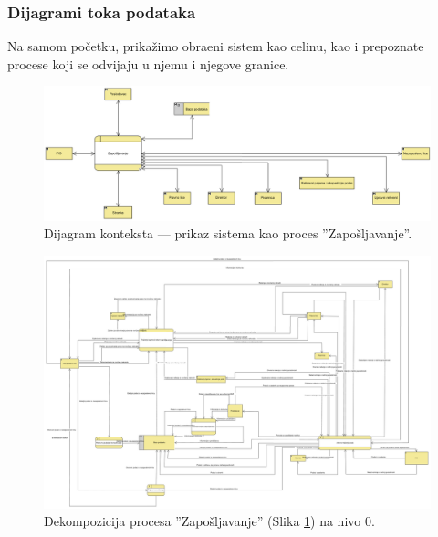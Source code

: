 \begin{mylandscape}
	\subsubsection{Dijagrami toka podataka}
	
	Na samom po\v cetku, prika\v zimo obra\dj eni sistem kao celinu, kao i prepoznate procese koji se odvijaju u njemu i njegove granice.
	
	\begin{figure}[H]
		\centering
		\includegraphics[width=0.8\paperwidth]{dijagrami/dijagrami-toka-podataka/zaposljavanje-dijagram-konteksta.png}
		\caption{Dijagram konteksta — prikaz sistema kao proces ''Zapo\v sljavanje''.}
		\label{dtp: dijagram konteksta}
	\end{figure}
	
	\newpage
	
	\begin{figure}[H]
		\centering
		\includegraphics[width=0.7\paperwidth]{dijagrami/dijagrami-toka-podataka/zaposljavanje-dtp-nivoa-0.png}
		\caption{Dekompozicija procesa ''Zapo\v sljavanje'' (Slika \ref{dtp: dijagram konteksta}) na nivo 0.}
	\end{figure}
	
\end{mylandscape}